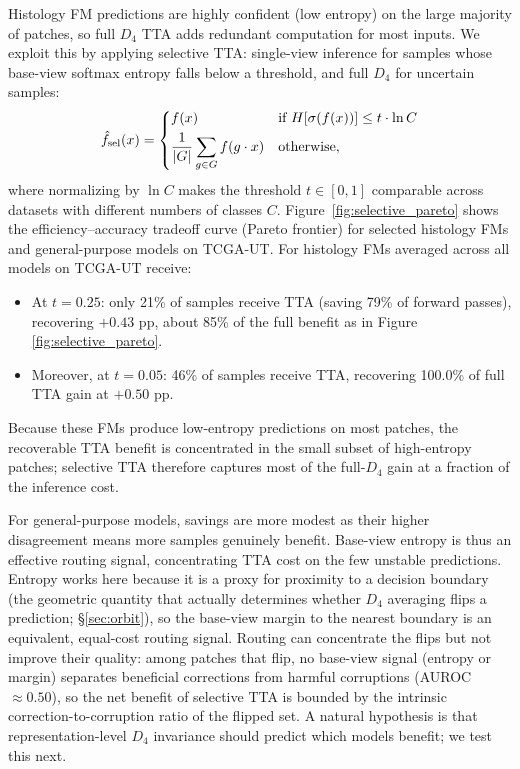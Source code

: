 \documentclass{melba}
\begin{document}
Histology FM predictions are highly confident (low entropy) on the large majority of patches, so full $D_4$ TTA adds redundant computation for most inputs. We exploit this by applying selective TTA: single-view inference for samples whose base-view softmax entropy falls below a threshold, and full $D_4$ for uncertain samples:
\begin{equation}
  \hat{f}_{\text{sel}}(x) =
  \begin{dcases}
    f(x) & \text{if } H[\sigma(f(x))] \le t \cdot \ln C \\
    \frac{1}{|G|} \sum_{g \in G} f(g \cdot x) & \text{otherwise},
  \end{dcases}
  \label{eq:selective}
\end{equation}
where normalizing by $\ln C$ makes the threshold $t \in [0,1]$ comparable across datasets with different numbers of classes $C$. Figure~\ref{fig:selective_pareto} shows the efficiency--accuracy tradeoff curve (Pareto frontier) for selected histology FMs and general-purpose models on TCGA-UT. For histology FMs averaged across all models on TCGA-UT receive:
\begin{itemize}
  \item At $t = 0.25$: only 21\% of samples receive TTA (saving 79\% of forward passes), recovering $+0.43$ pp, about 85\% of the full benefit as in Figure \ref{fig:selective_pareto}.
  \item Moreover, at $t = 0.05$: 46\% of samples receive TTA, recovering 100.0\% of full TTA gain at $+0.50$ pp.
\end{itemize}


Because these FMs produce low-entropy predictions on most patches, the recoverable TTA benefit is concentrated in the small subset of high-entropy patches; selective TTA therefore captures most of the full-$D_4$ gain at a fraction of the inference cost.

For general-purpose models, savings are more modest as their higher disagreement means more samples genuinely benefit. Base-view entropy is thus an effective routing signal, concentrating TTA cost on the few unstable predictions. Entropy works here because it is a proxy for proximity to a decision boundary (the geometric quantity that actually determines whether $D_4$ averaging flips a prediction; \S\ref{sec:orbit}), so the base-view margin to the nearest boundary is an equivalent, equal-cost routing signal. Routing can concentrate the flips but not improve their quality: among patches that flip, no base-view signal (entropy or margin) separates beneficial corrections from harmful corruptions (AUROC $\approx 0.50$), so the net benefit of selective TTA is bounded by the intrinsic correction-to-corruption ratio of the flipped set. A natural hypothesis is that representation-level $D_4$ invariance should predict which models benefit; we test this next.
\end{document}
